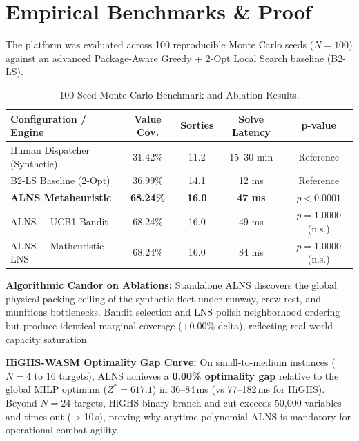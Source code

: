\documentclass[10pt,twocolumn,a4paper]{article}
\begin{document}
\vspace{-0.5em}
\section{Empirical Benchmarks \& Proof}
\footnotesize
The platform was evaluated across 100 reproducible Monte Carlo seeds ($N=100$) against an advanced Package-Aware Greedy + 2-Opt Local Search baseline (B2-LS).

\begin{table}[htbp]
\centering
\scriptsize
\setlength{\tabcolsep}{3pt}
\begin{tabularx}{\columnwidth}{lcccc}
\toprule
\textbf{Configuration / Engine} & \textbf{Value Cov.} & \textbf{Sorties} & \textbf{Solve Latency} & \textbf{p-value} \\
\midrule
Human Dispatcher (Synthetic) & 31.42\% & 11.2 & 15--30 min & Reference \\
B2-LS Baseline (2-Opt) & 36.99\% & 14.1 & 12 ms & Reference \\
\textbf{ALNS Metaheuristic} & \textbf{68.24\%} & \textbf{16.0} & \textbf{47 ms} & \textbf{$p < 0.0001$} \\
ALNS + UCB1 Bandit & 68.24\% & 16.0 & 49 ms & $p = 1.0000$ (n.s.) \\
ALNS + Matheuristic LNS & 68.24\% & 16.0 & 84 ms & $p = 1.0000$ (n.s.) \\
\bottomrule
\end{tabularx}
\vspace{-0.6em}
\caption{100-Seed Monte Carlo Benchmark and Ablation Results.}
\vspace{-0.8em}
\end{table}

\textbf{Algorithmic Candor on Ablations:} Standalone ALNS discovers the global physical packing ceiling of the synthetic fleet under runway, crew rest, and munitions bottlenecks. Bandit selection and LNS polish neighborhood ordering but produce identical marginal coverage (+0.00\% delta), reflecting real-world capacity saturation.

\textbf{HiGHS-WASM Optimality Gap Curve:} On small-to-medium instances ($N=4$ to $16$ targets), ALNS achieves a \textbf{0.00\% optimality gap} relative to the global MILP optimum ($Z^* = 617.1$) in 36--84\,ms (vs 77--182\,ms for HiGHS). Beyond $N=24$ targets, HiGHS binary branch-and-cut exceeds 50,000 variables and times out ($>$10\,s), proving why anytime polynomial ALNS is mandatory for operational combat agility.

\vspace{-0.5em}
\end{document}
